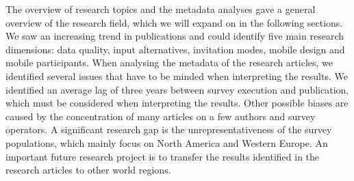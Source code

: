 The overview of research topics and the metadata analyses gave a general overview of the research field, which we will expand on in the following sections. We saw an increasing trend in publications and could identify five main research dimensions: data quality, input alternatives, invitation modes, mobile design and mobile participants. When analysing the metadata of the research articles, we identified several issues that have to be minded when interpreting the results. We identified an average lag of three years between survey execution and publication, which must be considered when interpreting the results. Other possible biases are caused by the concentration of many articles on a few authors and survey operators. A significant research gap is the unrepresentativeness of the survey populations, which mainly focus on North America and Western Europe. An important future research project is to transfer the results identified in the research articles to other world regions. 
